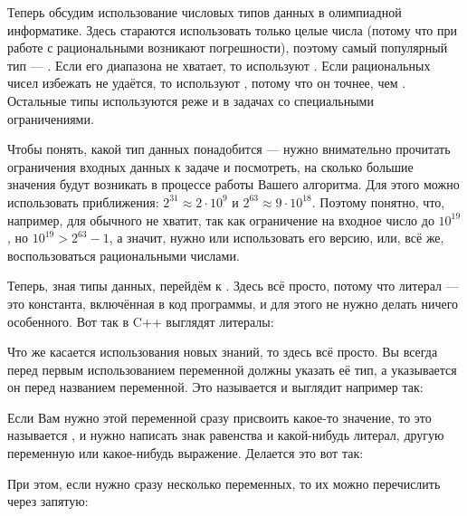 Теперь обсудим использование числовых типов данных в олимпиадной информатике. Здесь стараются использовать только целые числа (потому что при работе с рациональными возникают погрешности), поэтому самый популярный тип — . Если его диапазона не хватает, то используют . Если рациональных чисел избежать не удаётся, то используют , потому что он точнее, чем . Остальные типы используются реже и в задачах со специальными ограничениями.

Чтобы понять, какой тип данных понадобится — нужно внимательно прочитать ограничения входных данных к задаче и посмотреть, на сколько большие значения будут возникать в процессе работы Вашего алгоритма. Для этого можно использовать приближения: $2^{31} \approx 2 \cdot 10^9$ и $2^{63} \approx 9 \cdot 10^{18}$. Поэтому понятно, что, например, для  обычного  не хватит, так как ограничение на входное число до $10^{19}$, но $10^{19} > 2^{63} - 1$, а значит, нужно или использовать его  версию, или, всё же, воспользоваться рациональными числами.

Теперь, зная типы данных, перейдём к . Здесь всё просто, потому что литерал — это константа, включённая в код программы, и для этого не нужно делать ничего особенного. Вот так в C++ выглядят литералы:


Что же касается использования новых знаний, то здесь всё просто. Вы всегда перед первым использованием переменной должны указать её тип, а указывается он перед названием переменной. Это называется  и выглядит например так:


Если Вам нужно этой переменной сразу присвоить какое-то значение, то это называется , и нужно написать знак равенства и какой-нибудь литерал, другую переменную или какое-нибудь выражение. Делается это вот так:


При этом, если нужно сразу несколько переменных, то их можно перечислить через запятую:

